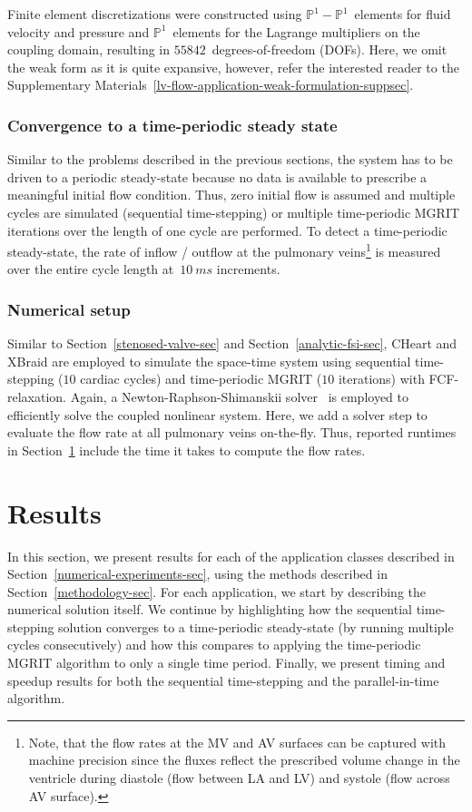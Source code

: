 \documentclass[3p]{elsarticle}
\begin{document}
Finite element discretizations were constructed using $\mathbb{P}^1 - \mathbb{P}^1$~elements
for fluid velocity and pressure and $\mathbb{P}^1$~elements for the Lagrange multipliers
on the coupling domain,
resulting in $55842$~degrees-of-freedom (DOFs).
Here, we omit the weak form as it is quite expansive,
however, refer the interested reader
to the Supplementary Materials~\ref{lv-flow-application-weak-formulation-suppsec}.
\subsubsection{Convergence to a time-periodic steady state}
\label{lv-steady-state-sec}
Similar to the problems described in the previous sections,
the system has to be driven to a periodic steady-state
because no data is available to prescribe a meaningful initial flow condition.
Thus, zero initial flow is assumed and multiple cycles are simulated
(sequential time-stepping) or multiple time-periodic MGRIT iterations
over the length of one cycle are performed.
To detect a time-periodic steady-state,
the rate of inflow / outflow at the pulmonary veins\footnote{Note,
that the flow rates at the MV and AV surfaces can be captured with machine precision
since the fluxes reflect the prescribed volume change in the ventricle
during diastole (flow between LA and LV) and systole (flow across AV surface).}
is measured over the entire cycle length at~$10~ms$ increments.
\subsubsection{Numerical setup}
\label{lv-numerical-setup-sec}
Similar to Section~\ref{stenosed-valve-sec}
and Section~\ref{analytic-fsi-sec}, CHeart and XBraid are employed
to simulate the space-time system using sequential time-stepping ($10$ cardiac cycles)
and time-periodic MGRIT ($10$ iterations) with FCF-relaxation.
Again, a Newton-Raphson-Shimanskii solver~\cite{Shamanskii1967}
is employed to efficiently solve the coupled nonlinear system.
Here, we add a solver step to evaluate the flow rate at all pulmonary veins on-the-fly.
Thus, reported runtimes in Section~\ref{results-sec} include the time it takes to compute the flow rates.
\section{Results}\label{results-sec}
In this section, we present results for each of the application classes
described in Section~\ref{numerical-experiments-sec},
using the methods described in Section~\ref{methodology-sec}.
For each application, we start by describing the numerical solution itself.
We continue by highlighting how the sequential time-stepping solution
converges to a time-periodic steady-state
(by running multiple cycles consecutively) and how this compares
to applying the time-periodic MGRIT algorithm to only a single time period.
Finally, we present timing and speedup results for both
the sequential time-stepping and the parallel-in-time algorithm.
\end{document}
